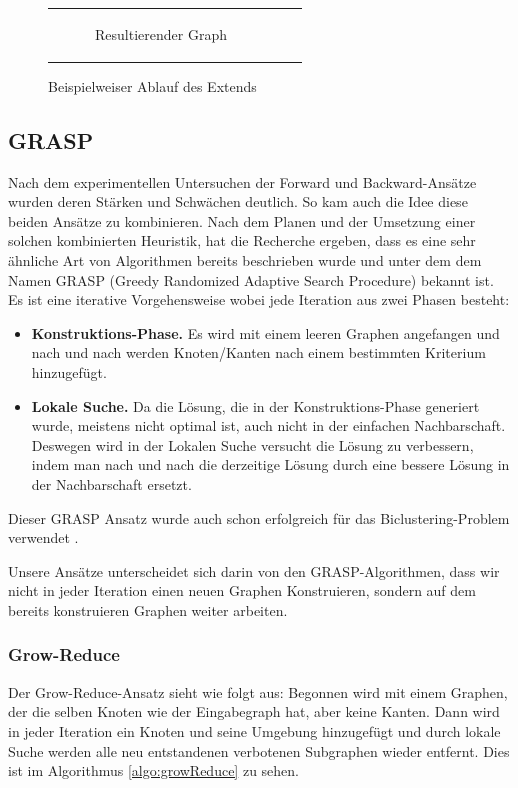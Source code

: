 \documentclass[12pt,a4paper,onecolumn,oneside,titlepage]{article}
\begin{document}
\begin{figure}
\begin{tabular}[c]{ccc}
\begin{subfigure}[b]{0.32\textwidth}
      \caption{Resultierender Graph}
      \label{fig:algo:extend:6}
    \end{subfigure}
  \end{tabular}
  \caption{Beispielweiser Ablauf des Extends}\label{fig:algo:extend}
\end{figure}

\subsection{GRASP}
Nach dem experimentellen Untersuchen der Forward und Backward-Ansätze wurden deren Stärken und Schwächen deutlich. So kam auch die Idee diese beiden Ansätze zu kombinieren. Nach dem Planen und der Umsetzung einer solchen kombinierten Heuristik, hat die Recherche ergeben, dass es eine sehr ähnliche Art von Algorithmen bereits beschrieben wurde und unter dem dem Namen GRASP (Greedy Randomized Adaptive Search Procedure) \cite{Feo95} \cite{Bastos2014} bekannt ist. Es ist eine iterative Vorgehensweise wobei jede Iteration aus zwei Phasen besteht: 
\begin{itemize}
\item \textbf{Konstruktions-Phase.} Es wird mit einem leeren Graphen angefangen und nach und nach werden Knoten/Kanten nach einem bestimmten Kriterium hinzugefügt.
\item \textbf{Lokale Suche.} Da die Lösung, die in der Konstruktions-Phase generiert wurde, meistens nicht optimal ist, auch nicht in der einfachen Nachbarschaft. Deswegen wird in der Lokalen Suche versucht die Lösung zu verbessern, indem man nach und nach die derzeitige Lösung durch eine bessere Lösung in der Nachbarschaft ersetzt.
\end{itemize}
Dieser GRASP Ansatz wurde auch schon erfolgreich für das Biclustering-Problem verwendet \cite{De12}.

Unsere Ansätze unterscheidet sich darin von den GRASP-Algorithmen, dass wir nicht in jeder Iteration einen neuen Graphen Konstruieren, sondern auf dem bereits konstruieren Graphen weiter arbeiten. 

\subsubsection{Grow-Reduce}
Der Grow-Reduce-Ansatz sieht wie folgt aus: Begonnen wird mit einem Graphen, der die selben Knoten wie der Eingabegraph hat, aber keine Kanten. Dann wird in jeder Iteration ein Knoten und seine Umgebung hinzugefügt und durch lokale Suche werden alle neu entstandenen verbotenen Subgraphen wieder entfernt. Dies ist im Algorithmus \ref{algo:growReduce} zu sehen. 
\end{document}
